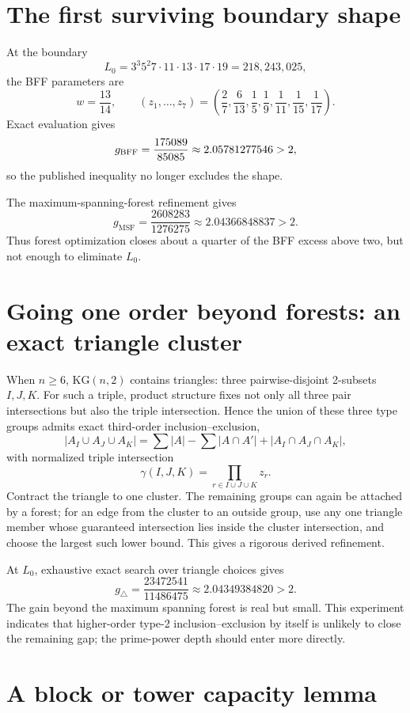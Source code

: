 \documentclass[11pt]{article}
\theoremstyle{definition}
\newcommand{\kg}{\mathrm{KG}}
\newcommand{\MSF}{\mathrm{MSF}}
\begin{document}
\section{The first surviving boundary shape}

At the boundary
\begin{equation}\label{eq:L0}
 L_0=3^3 5^2 7\cdot11\cdot13\cdot17\cdot19
     =218{,}243{,}025,
\end{equation}
the BFF parameters are
\[
 w=\frac{13}{14},\qquad
 (z_1,\dots,z_7)=
 \left(\frac27,\frac6{13},\frac15,\frac19,\frac1{11},\frac1{15},\frac1{17}\right).
\]
Exact evaluation gives
\[
 g_{\rm BFF}=\frac{175089}{85085}\approx2.05781277546>2,
\]
so the published inequality no longer excludes the shape.

The maximum-spanning-forest refinement gives
\[
 g_{\MSF}=\frac{2608283}{1276275}\approx2.04366848837>2.
\]
Thus forest optimization closes about a quarter of the BFF excess above two, but not enough to
eliminate $L_0$.

\section{Going one order beyond forests: an exact triangle cluster}

When $n\ge6$, $\kg(n,2)$ contains triangles: three pairwise-disjoint 2-subsets
$I,J,K$.  For such a triple, product structure fixes not only all three pair intersections but
also the triple intersection.  Hence the union of these three type groups admits exact
third-order inclusion--exclusion,
\[
 |A_I\cup A_J\cup A_K|
 =\sum |A|-\sum |A\cap A'|+|A_I\cap A_J\cap A_K|,
\]
with normalized triple intersection
\[
 \gamma(I,J,K)=\prod_{r\in I\cup J\cup K}z_r.
\]
Contract the triangle to one cluster.  The remaining groups can again be attached by a forest;
for an edge from the cluster to an outside group, use any one triangle member whose guaranteed
intersection lies inside the cluster intersection, and choose the largest such lower bound.
This gives a rigorous derived refinement.

At $L_0$, exhaustive exact search over triangle choices gives
\[
 g_{\triangle}=\frac{23472541}{11486475}
 \approx2.04349384820>2.
\]
The gain beyond the maximum spanning forest is real but small.  This experiment indicates that
higher-order type-2 inclusion--exclusion by itself is unlikely to close the remaining gap; the
prime-power depth should enter more directly.

\section{A block or tower capacity lemma}
\end{document}
